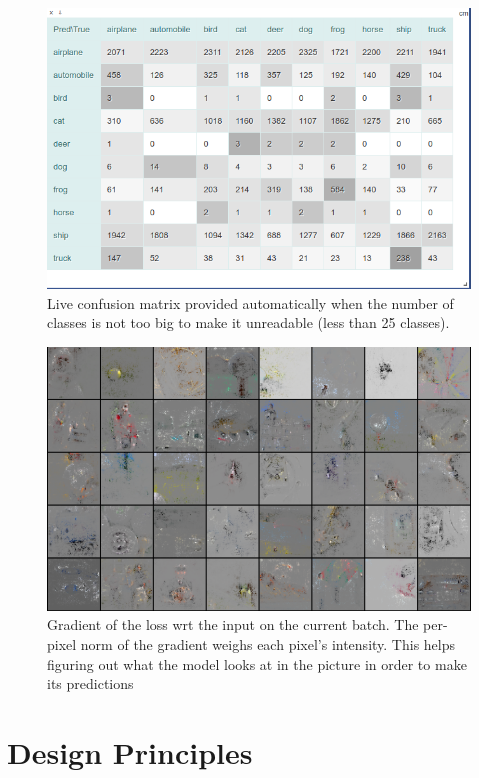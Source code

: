 \begin{figure}[h]
    \centering
    \includegraphics[width=\columnwidth]{90-files/confmatrix.png}
    \caption{Live confusion matrix provided automatically when the number of classes is not too big to make it unreadable (less than 25 classes).}
    \label{fig:confmatrix}
\end{figure}

\begin{figure}
    \centering
    \includegraphics[width=\columnwidth]{90-files/gradients.png}
    \caption{Gradient of the loss wrt the input on the current batch. The per-pixel norm of the gradient weighs each pixel's intensity. This helps figuring out what the model looks at in the picture in order to make its predictions}
    \label{fig:gradients}
\end{figure}



\section{Design Principles}

